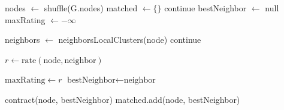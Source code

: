 \documentclass{article}
\begin{document}
\begin{algorithm}
\caption{Coarsening}
\begin{algorithmic}
    \State nodes $\gets $ shuffle(G.nodes)
    \State matched $\gets \{\}$
    \Statex
            \State continue
        \EndIf
        \State bestNeighbor $\gets$ null
        \State maxRating $\gets -\infty$
        \Statex

        \State neighbors $\gets$ neighborsLocalClusters(node)
                \State continue
            \EndIf
            \Statex
            

            \State $r \gets \text{rate}(\text{node},\text{neighbor})$
            
                \State $\text{maxRating} \gets r$
                \State $\text{bestNeighbor} \gets \text{neighbor}$
            \EndIf
        \EndFor
        \Statex

            \State contract(node, bestNeighbor)
            \State matched.add(node, bestNeighbor)
        \EndIf
    
    \EndFor
    \Statex

\end{algorithmic}
\end{algorithm}



\newpage
\end{document}

